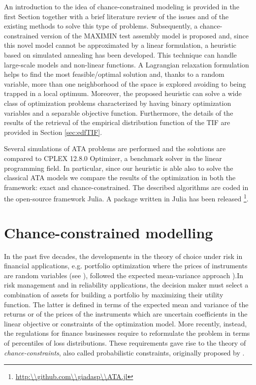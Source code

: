 An introduction to the idea of chance-constrained modeling is provided in the first Section together with a brief literature review of the issues and of the existing methods to solve this type of problems.
Subsequently, a chance-constrained version of the MAXIMIN test assembly model is proposed and, since this novel model cannot be approximated by a linear formulation, a heuristic based on simulated annealing \parencite{goffe1996simann} has been developed.
This technique can handle large-scale models and non-linear functions.
A Lagrangian relaxation formulation helps to find the most feasible/optimal solution and, thanks to a random variable, more than one neighborhood of the space is explored avoiding to being trapped in a local optimum.
Moreover, the proposed heuristic can solve a wide class of optimization problems characterized by having binary optimization variables and a separable objective function.
Furthermore, the details of the results of the retrieval of the empirical distribution function of the TIF are provided in Section \ref{sec:edfTIF}.

Several simulations of ATA problems are performed and the solutions are compared to CPLEX 12.8.0 Optimizer, a benchmark solver in the linear programming field. 
In particular, since our heuristic is able also to solve the classical ATA models we compare the results of the optimization in both the framework: exact and chance-constrained.
The described algorithms are coded in the open-source framework Julia.
A package written in Julia has been released \footnote{\url{http:\\github.com\\giadasp\\ATA.jl}}.

\section{Chance-constrained modelling}

In the past five decades, the developments in the theory of choice under risk in financial applications, e.g. portfolio optimization where the prices of instruments are random variables (see \textcite{rockafellar2000optimization,rockafellar2001uryasev}),  followed the expected mean-variance approach \parencite{chen1973quadratic,freund1956introduction,scott1972practical}).In risk management and in reliability applications, the decision maker must select a combination of assets for building a portfolio by maximizing their utility function.
The latter is defined in terms of the expected mean and variance of the returns or of the prices of the instruments which are uncertain coefficients in the linear objective or constraints of the optimization model.
More recently, instead, the regulations for finance businesses require to reformulate the problem in terms of percentiles of loss distributions.
These requirements gave rise to the theory of \emph{chance-constraints}, also called probabilistic constraints, originally proposed by \textcite{Charnes1959}. 

